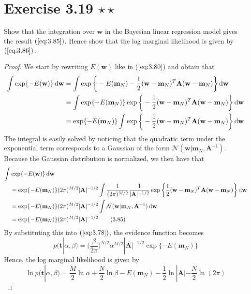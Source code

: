 \section*{Exercise 3.19 $\star \star$}
Show that the integration over $\mathbf{w}$ in the Bayesian 
linear regression model gives the result $(\ref{eq:3.85})$.
Hence show that the log marginal likelihood is given by 
$(\ref{eq:3.86})$.

\vspace{1em}

\begin{proof}
    We start by rewriting $E(\mathbf{w})$ like in ($\ref{eq:3.80}$) and obtain that
    \begin{align*}
        \int \exp\{-E(\mathbf{w})\} \mathop{}\!\mathrm{d} \mathbf{w}
        &= \int \exp\bigg\{-E(\mathbf{m}_N) -
            \frac{1}{2} (\mathbf{w} - \mathbf{m}_N)^T\mathbf{A}(\mathbf{w} - \mathbf{m}_N)
            \bigg\}\mathop{}\!\mathrm{d} \mathbf{w} \\
        &= \int \exp\{-E(\mathbf{m}_N)\}
            \exp\bigg\{-\frac{1}{2} (\mathbf{w} - \mathbf{m}_N)^T\mathbf{A}(\mathbf{w} - \mathbf{m}_N)
            \bigg\}\mathop{}\!\mathrm{d} \mathbf{w} \\
        &= \exp\{-E(\mathbf{m}_N)\}  
            \int \exp\bigg\{-\frac{1}{2} (\mathbf{w} - \mathbf{m}_N)^T\mathbf{A}(\mathbf{w} - \mathbf{m}_N)
            \bigg\}\mathop{}\!\mathrm{d} \mathbf{w}
    \end{align*}
    The integral is easily solved by noticing that the quadratic 
    term under the exponential term corresponds to a Gaussian of
    the form $\mathcal{N}(\mathbf{w} | \mathbf{m}_N, \mathbf{A}^{-1})$.
    Because the Gaussian distribution is normalized, we then have that
    \begin{align*}
        \int &\exp\{-E(\mathbf{w})\} \mathop{}\!\mathrm{d} \mathbf{w} \\
        &= \exp\{-E(\mathbf{m}_N)\} (2\pi)^{M / 2} |\mathbf{A}|^{-1/2}
            \int\frac{1}{(2\pi)^{M/2}}\frac{1}{|\mathbf{A}|^{-1/2}}
            \exp\bigg\{\frac{1}{2}
                (\mathbf{w} - \mathbf{m}_N)^T\mathbf{A}(\mathbf{w} - \mathbf{m}_N)
            \bigg\}\mathop{}\!\mathrm{d} \mathbf{w} \\
        &= \exp\{-E(\mathbf{m}_N)\} (2\pi)^{M / 2} |\mathbf{A}|^{-1/2}
            \int \mathcal{N}(\mathbf{w} | \mathbf{m}_N, \mathbf{A}^{-1}) \mathop{}\!\mathrm{d} \mathbf{w} \\
        &= \exp\{-E(\mathbf{m}_N)\} (2\pi)^{M / 2} |\mathbf{A}|^{-1/2} \tag{3.85}\label{eq:3.85}
    \end{align*}
    By substituting this into $(\ref{eq:3.78})$, the evidence function becomes
    \[
        p(\mathbf{t} | \alpha, \beta) 
        = \bigg(\frac{\beta}{2\pi}\bigg)^{N / 2} \alpha^{M/2} |\mathbf{A}|^{-1/2}
            \exp\{-E(\mathbf{m}_N)\}
    \] 
    Hence, the log marginal likelihood is given by
    \begin{equation*}
        \ln p(\mathbf{t} | \alpha, \beta)
        = \frac{M}{2} \ln \alpha + \frac{N}{2} \ln \beta - E(\mathbf{m}_N)
            -\frac{1}{2} \ln|\mathbf{A}| - \frac{N}{2} \ln(2\pi)
        \tag{3.86}\label{eq:3.86}
    \end{equation*}
\end{proof}

